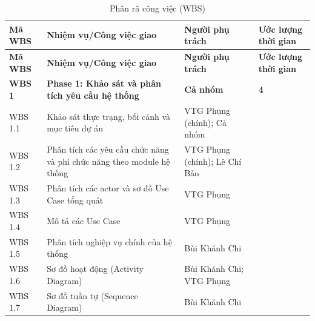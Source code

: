 \begin{longtable}{|C{0.13\textwidth}|C{0.43\textwidth}|C{0.27\textwidth}|C{0.11\textwidth}|}
\caption{Phân rã công việc (WBS)}
\label{tab:wbs}
\\
\hline

\textbf{Mã WBS} &
\textbf{Nhiệm vụ/Công việc giao} &
\textbf{Người phụ trách} &
\textbf{Ước lượng thời gian} \\

\hline
\endfirsthead

\hline
\textbf{Mã WBS} &
\textbf{Nhiệm vụ/Công việc giao} &
\textbf{Người phụ trách} &
\textbf{Ước lượng thời gian} \\

\hline
\endhead

\hline
\endfoot


\textbf{WBS 1} &
\textbf{Phase 1: Khảo sát và phân tích yêu cầu hệ thống} &
\textbf{Cả nhóm} &
\textbf{4} \\

\hline

WBS 1.1 &
Khảo sát thực trạng, bối cảnh và mục tiêu dự án &
VTG Phụng (chính); Cả nhóm & \\

\hline

WBS 1.2 &
Phân tích các yêu cầu chức năng và phi chức năng theo module hệ thống &
VTG Phụng (chính); Lê Chí Bảo & \\

\hline

WBS 1.3 &
Phân tích các actor và sơ đồ Use Case tổng quát &
VTG Phụng & \\

\hline

WBS 1.4 &
Mô tả các Use Case &
VTG Phụng & \\

\hline

WBS 1.5 &
Phân tích nghiệp vụ chính của hệ thống &
Bùi Khánh Chi & \\

\hline

WBS 1.6 &
Sơ đồ hoạt động (Activity Diagram) &
Bùi Khánh Chi; VTG Phụng & \\

\hline

WBS 1.7 &
Sơ đồ tuần tự (Sequence Diagram) &
Bùi Khánh Chi & \\


\end{longtable}
